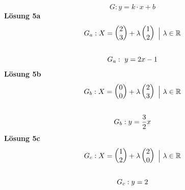 \begin{equation*}
	G:y=k\cdotp x+b
\end{equation*}
\textbf{Lösung 5a}
\begin{gather*}
	G_{a} :X=\begin{pmatrix}
		2\\
		3
	\end{pmatrix} +\lambda \begin{pmatrix}
		1\\
		2
	\end{pmatrix} \ \Bigl| \ \lambda \in \mathbb{R}\\
	\\
	G_{a} :\ y=2x-1
\end{gather*}
\textbf{Lösung 5b}
\begin{gather*}
	G_{b} :X=\begin{pmatrix}
		0\\
		0
	\end{pmatrix} +\lambda \begin{pmatrix}
		2\\
		3
	\end{pmatrix} \ \Bigl| \ \lambda \in \mathbb{R}\\
	\\
	G_{b} :y=\frac{3}{2} x
\end{gather*}
\textbf{Lösung 5c}
\begin{gather*}
	G_{c} :X=\begin{pmatrix}
		1\\
		2
	\end{pmatrix} +\lambda \begin{pmatrix}
		2\\
		0
	\end{pmatrix} \ \Bigl| \ \lambda \in \mathbb{R}\\
	\\
	G_{c} :y=2
\end{gather*}